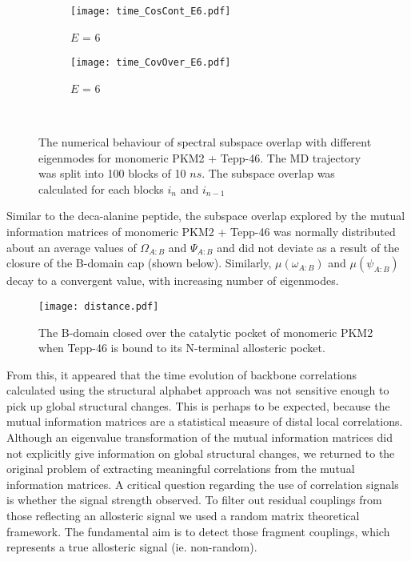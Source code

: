 \documentclass[11pt]{article}
\begin{document}
\begin{figure}[hbt]
\begin{subfigure}[b]{.24\linewidth}
  \end{subfigure}%
  \begin{subfigure}[b]{.24\linewidth}
    \centering
    \texttt{[image: time\_CosCont\_E6.pdf]}
    \caption{$E$ = 6}\label{fig:1k}
  \end{subfigure}%
  \begin{subfigure}[b]{.24\linewidth}
    \centering
    \texttt{[image: time\_CovOver\_E6.pdf]}
    \caption{$E$ = 6}\label{fig:1l}
  \end{subfigure}\\%
\caption{The numerical behaviour of spectral subspace overlap with different eigenmodes for monomeric PKM2 + Tepp-46. The MD trajectory was split into 100 blocks of 10 $ns$. The subspace overlap was calculated for each blocks $i_{n}$ and $i_{n-1}$}\label{fig:1}
\end{figure}
Similar to the deca-alanine peptide, the subspace overlap explored by the mutual information matrices of monomeric PKM2 + Tepp-46 was normally distributed about an average values of $ \Omega_{A:B} $ and $ \Psi_{A:B} $ and did not deviate as a result of the closure of the B-domain cap (shown below). Similarly, $\mu (\omega_{A:B}) $ and $\mu (\psi_{A:B}) $ decay to a convergent value, with increasing number of eigenmodes.
\begin{figure}[!ht]
\centering
\texttt{[image: distance.pdf]}
\caption{The B-domain closed over the catalytic pocket of monomeric PKM2 when Tepp-46 is bound to its N-terminal allosteric pocket.}\label{fig:2} 
\end{figure}
From this, it appeared that the time evolution of backbone correlations calculated using the structural alphabet approach was not sensitive enough to pick up global structural changes. This is perhaps to be expected, because the mutual information matrices are a statistical measure of distal local correlations. Although an eigenvalue transformation of the mutual information matrices did not explicitly give information on global structural changes, we returned to the original problem of extracting meaningful correlations from the mutual information matrices. A critical question regarding the use of correlation signals is whether the signal strength observed. To filter out residual couplings from those reflecting an allosteric signal we used a random matrix theoretical framework. The fundamental aim is to detect those fragment couplings, which represents a true allosteric signal (ie. non-random). 
\end{document}
